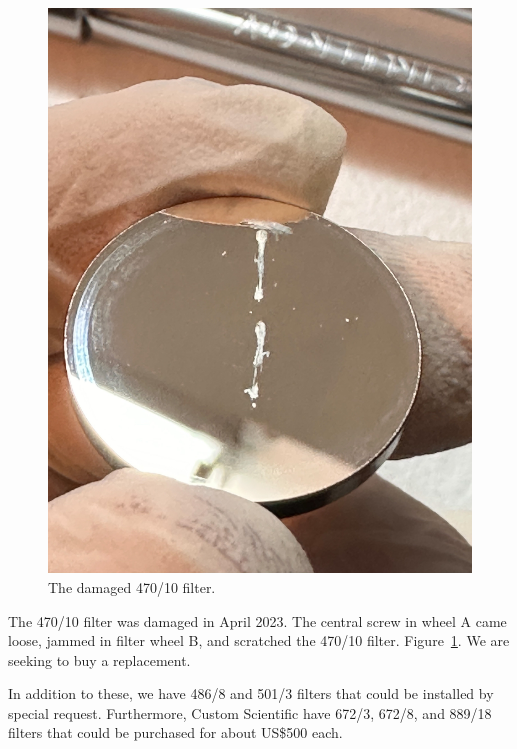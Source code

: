 \begin{itemize}
\begin{figure}
\begin{center}
\includegraphics[width=0.7\linewidth]{figures/huitzi-f20-damaged-470-10-filter.jpg}
\medskip
\caption{The damaged 470/10 filter.}
\label{figure:huitzi-f20-damaged-470-10-filter}
\end{center}
\end{figure}

The 470/10 filter was damaged in April 2023. The central screw in wheel A came loose, jammed in filter wheel B, and scratched the 470/10 filter. Figure~\ref{figure:huitzi-f20-damaged-470-10-filter}. We are seeking to buy a replacement.

In addition to these, we have 486/8 and 501/3 filters that could be installed by special request. Furthermore, Custom Scientific have 672/3, 672/8, and 889/18 filters that could be purchased for about US\$500 each.
\end{itemize}


